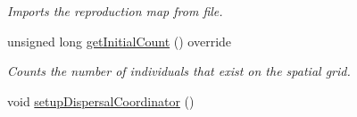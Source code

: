 \begin{DoxyCompactItemize}
\begin{DoxyCompactList}\small\item\em Imports the reproduction map from file. \end{DoxyCompactList}\item 
unsigned long \hyperlink{class_spatial_tree_a05ac9205ab49dbe6056522722372063b}{get\+Initial\+Count} () override
\begin{DoxyCompactList}\small\item\em Counts the number of individuals that exist on the spatial grid. \end{DoxyCompactList}\item 
void \hyperlink{class_spatial_tree_a3ce93c4d62367f17dd523cab4cc35ae8}{setup\+Dispersal\+Coordinator} ()\hypertarget{class_spatial_tree_a3ce93c4d62367f17dd523cab4cc35ae8}{}\label{class_spatial_tree_a3ce93c4d62367f17dd523cab4cc35ae8}


\end{DoxyCompactItemize}
